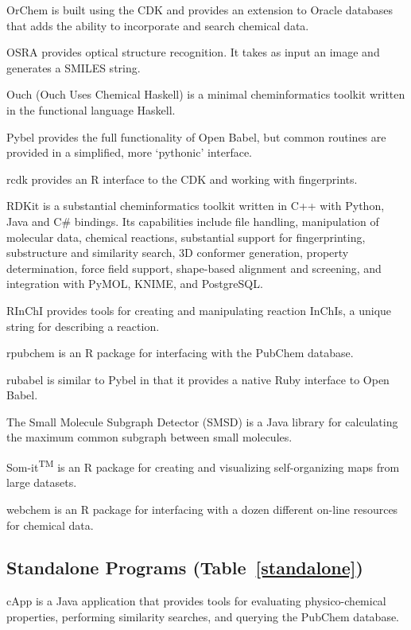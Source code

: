 OrChem is built using the CDK and provides an extension to Oracle databases that adds the ability to incorporate and search chemical data.

OSRA \cite{Filippov_2009} provides optical structure recognition. It takes as input an image and generates a SMILES string.

Ouch (Ouch Uses Chemical Haskell) is a minimal cheminformatics toolkit written in the functional language Haskell.

Pybel \cite{pybel} provides the full functionality of Open Babel, but common routines are provided in a simplified, more `pythonic' interface.

rcdk \cite{guha2007chemical}  provides an R interface to the CDK and working with fingerprints.


RDKit is a substantial cheminformatics toolkit written in C++ with Python, Java and C\# bindings.  Its capabilities include file handling, manipulation of molecular data, chemical reactions, substantial support for fingerprinting, substructure and similarity search, 3D conformer generation, property determination, force field support, shape-based alignment and screening, and integration with PyMOL, KNIME, and PostgreSQL.

RInChI provides tools for creating and manipulating reaction InChIs, a unique string for describing a reaction.

rpubchem is an R package for interfacing with the PubChem database.

rubabel \cite{Smith_2013} is similar to Pybel in that it provides a native Ruby interface to Open Babel.

The Small Molecule Subgraph Detector (SMSD) \cite{Rahman_2009} is a Java library for calculating the maximum common subgraph between small molecules.

Som-it\textsuperscript{TM}  is an R package for creating and visualizing self-organizing maps from large datasets.

webchem is an R package for interfacing with a dozen different on-line resources for chemical data.

\subsection*{Standalone Programs (Table~\ref{standalone})}

cApp \cite{Amani_2015} is a Java application that provides tools for evaluating physico-chemical properties, performing similarity searches, and querying the PubChem database.

